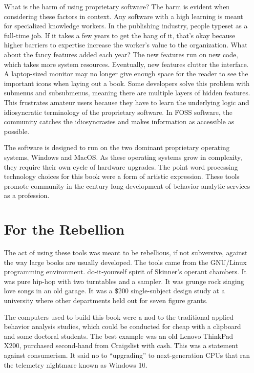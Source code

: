 What is the harm of using proprietary software? The harm is evident when considering these factors in context. Any software with a high learning is meant for specialized knowledge workers. In the publishing industry, people typeset as a full-time job. If it takes a few years to get the hang of it, that's okay because higher barriers to expertise increase the worker's value to the organization. What about the fancy features added each year? The new features run on new code, which takes more system resources. Eventually, new features clutter the interface. A laptop-sized monitor may no longer give enough space for the reader to see the important icons when laying out a book. Some developers solve this problem with submenus and subsubmenus, meaning there are multiple layers of hidden features. This frustrates amateur users because they have to learn the underlying logic and idiosyncratic terminology of the proprietary software. In FOSS software, the community catches the idiosyncrasies and makes information as accessible as possible.

The software is designed to run on the two dominant proprietary operating systems, Windows and MacOS. As these operating systems grow in complexity, they require their own cycle of hardware upgrades. The point word processing technology choices for this book were a form of artistic expression. These tools promote community in the century-long development of behavior analytic services as a profession. 

\section{For the Rebellion}
The act of using these tools was meant to be rebellious, if not subversive, against the way large books are usually developed. The tools came from the GNU/Linux programming environment. do-it-yourself spirit of Skinner's operant chambers. It was pure hip-hop with two turntables and a sampler. It was grunge rock singing love songs in an old garage. It was a \$200 single-subject design study at a university where other departments held out for seven figure grants.

The computers used to build this book were a nod to the traditional applied behavior analysis studies, which could be conducted for cheap with a clipboard and some doctoral students. The best example was an old Lenovo ThinkPad X200, purchased second-hand from Craigslist with cash. This was a statement against consumerism. It said no to ``upgrading'' to next-generation CPUs that ran the telemetry nightmare known as Windows 10.

